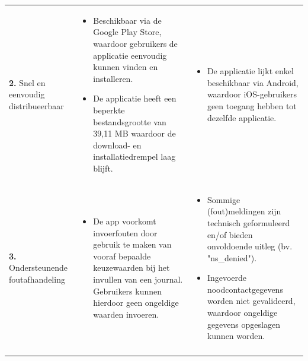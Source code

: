 {\begin{longtable}{
            >{\raggedright\arraybackslash}p{5.23cm}
            >{\raggedright\arraybackslash}p{4.93cm}
            >{\raggedright\arraybackslash}p{4.93cm}
        }
        \addlinespace[5pt]
        
        \textbf{2.} Snel en eenvoudig distribueerbaar
        & 
        \begin{itemize}[nosep,leftmargin=*,itemsep=10pt]
            \renewcommand{\labelitemi}{+}
            \item Beschikbaar via de Google Play Store, waardoor gebruikers de applicatie eenvoudig kunnen vinden en installeren.
            \item De applicatie heeft een beperkte bestandsgrootte van 39,11 MB waardoor de download- en installatiedrempel laag blijft.
        \end{itemize}
        & 
        \begin{itemize}[nosep,leftmargin=*,itemsep=10pt]
            \renewcommand{\labelitemi}{-}
            \item De applicatie lijkt enkel beschikbaar via Android, waardoor iOS-gebruikers geen toegang hebben tot dezelfde applicatie.
        \end{itemize}
        \\
        
        \addlinespace[5pt]
        
        \textbf{3.} Ondersteunende foutafhandeling
        & 
        \begin{itemize}[nosep,leftmargin=*,itemsep=10pt]
            \renewcommand{\labelitemi}{+}
            \item De app voorkomt invoerfouten door gebruik te maken van vooraf bepaalde keuzewaarden bij het invullen van een journal. Gebruikers kunnen hierdoor geen ongeldige waarden invoeren.
        \end{itemize}
        & 
        \begin{itemize}[nosep,leftmargin=*,itemsep=10pt]
            \renewcommand{\labelitemi}{-}
            \item Sommige (fout)meldingen zijn technisch geformuleerd en/of bieden onvoldoende uitleg (bv. "ns\_denied").
            \item Ingevoerde noodcontactgegevens worden niet gevalideerd, waardoor ongeldige gegevens opgeslagen kunnen worden.
        \end{itemize}
        \\
        
        \addlinespace[5pt]
        

\end{longtable}}
